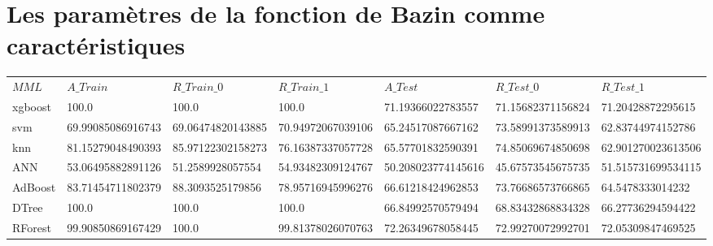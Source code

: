 \documentclass{report}
\begin{document}
	\section*{Les paramètres de la fonction de Bazin comme caractéristiques}
		\begin{table}[H]
		\begin{tabular} {|l|l|l|l|l|l|l|}
			\hline
			$MML$&$A\_Train$ & $R\_Train\_0 $ & $R\_Train\_1$ & $A\_Test$ & $R\_Test\_0 $ & $R\_Test\_1$\\	
			xgboost & 100.0 & 100.0 & 100.0 & 71.19366022783557 & 71.15682371156824 &  71.20428872295615 \\
			\hline
			svm & 69.99085086916743 & 69.06474820143885 & 70.94972067039106 & 65.24517087667162 & 73.58991373589913 & 62.83744974152786 \\
			\hline
			knn & 81.15279048490393 & 85.97122302158273 & 76.16387337057728 & 65.57701832590391 & 74.85069674850698 & 62.901270023613506 \\
			\hline
			ANN & 53.06495882891126 & 51.2589928057554 & 54.93482309124767 & 50.208023774145616 & 45.67573545675735 & 51.515731699534115 \\
			\hline
			AdBoost & 83.71454711802379 & 88.3093525179856 & 78.95716945996276 & 66.61218424962853 & 73.76686573766865 & 64.5478333014232 \\
			\hline
			DTree & 100.0 & 100.0 & 100.0 & 66.84992570579494 & 68.83432868834328 & 66.27736294594422 \\
			\hline
			RForest & 99.90850869167429 & 100.0 & 99.81378026070763 & 72.26349678058445 & 72.99270072992701 & 72.05309847469525 \\		
			\hline
		\end{tabular}
	\end{table}
\end{document}
